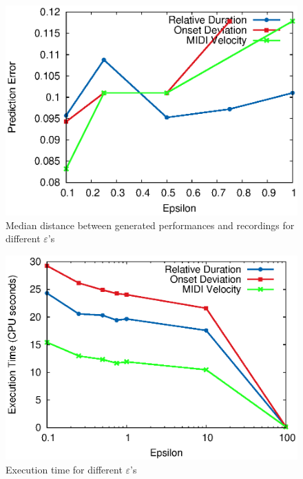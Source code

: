 \begin{figure}[tp]
   \begin{center}
      \includegraphics[width=\textwidth]{fig/eps_accu.eps}

   \end{center}
   \caption{Median distance between generated performances and recordings for different $\varepsilon$'s}
   \label{fig:eps_accu}
\end{figure}
\begin{figure}[tp]
   \begin{center}
      \includegraphics[width=\textwidth]{fig/eps_time.eps}

   \end{center}
   \caption{Execution time for different $\varepsilon$'s}
   \label{fig:eps_time}
\end{figure}

